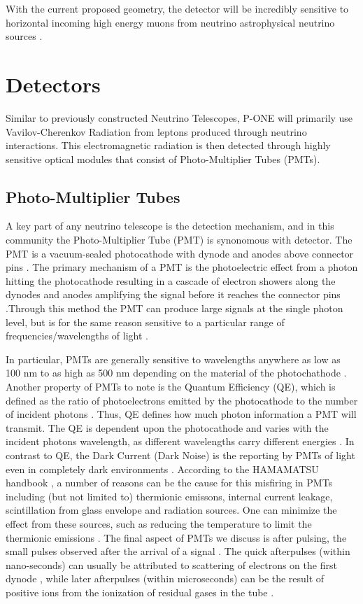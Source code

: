 With the current proposed geometry, the detector will be incredibly sensitive to horizontal incoming high energy muons from neutrino astrophysical neutrino sources \cite{pone}. 

\section{Detectors}
Similar to previously constructed Neutrino Telescopes, P-ONE will primarily use Vavilov-Cherenkov Radiation from leptons produced through neutrino interactions. This electromagnetic radiation is then detected through highly sensitive optical modules that consist of Photo-Multiplier Tubes (PMTs).

\subsection{Photo-Multiplier Tubes}

A key part of any neutrino telescope is the detection mechanism, and in this community the Photo-Multiplier Tube (PMT) is synonomous with detector. The PMT is a vacuum-sealed photocathode with dynode and anodes above connector pins \cite{ham}. The primary mechanism of a PMT is the photoelectric effect from a photon hitting the photocathode resulting in a cascade of electron showers along the dynodes and anodes amplifying the signal before it reaches the connector pins \cite{pmt_hist}.Through this method the PMT can produce large signals at the single photon level, but is for the same reason sensitive to a particular range of frequencies/wavelengths of light \cite{pmt_hist}.

In particular, PMTs are generally sensitive to wavelengths anywhere as low as 100 nm to as high as 500 nm depending on the material of the photochathode \cite{ham}. Another property of PMTs to note is the Quantum Efficiency (QE), which is defined as the ratio of photoelectrons emitted by the photocathode to the number of incident photons \cite{ham}. Thus, QE defines how much photon information a PMT will transmit. The QE is dependent upon the photocathode and varies with the incident photons wavelength, as different wavelengths carry different energies \cite{ham}. In contrast to QE, the Dark Current (Dark Noise) is the reporting by PMTs of light even in completely dark environments \cite{ham}. According to the HAMAMATSU handbook \cite{ham}, a number of reasons can be the cause for this misfiring in PMTs including (but not limited to) thermionic emissons, internal current leakage, scintillation from glass envelope and radiation sources. One can minimize the effect from these sources, such as reducing the temperature to limit the thermionic emissions \cite{ham}. The final aspect of PMTs we discuss is after pulsing, the small pulses observed after the arrival of a signal \cite{ham}. The quick afterpulses (within nano-seconds) can usually be attributed to scattering of electrons on the first dynode \cite{ham}, while later afterpulses (within microseconds) can be the result of positive ions from the ionization of residual gases in the tube \cite{ham}.

